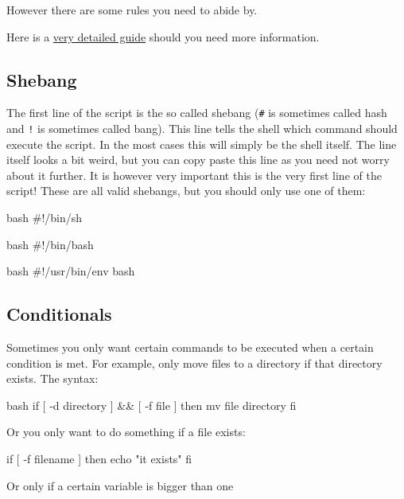 However there are some rules you need to abide by.

Here is a \href{http://www.tldp.org/LDP/Bash-Beginners-Guide/html/}{very detailed guide} should you need more information.

\subsection{Shebang}
The first line of the script is the so called shebang (\verb|#| is sometimes called
hash and \verb|!| is sometimes called bang). This line tells the shell which
command should execute the script. In the most cases this will simply be the
shell itself. The line itself looks a bit weird, but you can copy paste this
line as you need not worry about it further. It is however very important this
is the very first line of the script! These are all valid shebangs, but you should
only use one of them:

\begin{code}{bash}
 #!/bin/sh
\end{code}

\begin{code}{bash}
 #!/bin/bash
\end{code}

\begin{code}{bash}
 #!/usr/bin/env bash
\end{code}

\subsection{Conditionals}

Sometimes you only want certain commands to be executed when a certain condition
is met. For example, only move files to a directory if that directory exists.
The syntax:

\begin{code}{bash}
 if [ -d directory ] && [ -f file ]
 then
    mv file directory
 fi

Or you only want to do something if  a file exists:

 if [ -f filename ]
 then
    echo "it exists"
 fi
\end{code}

Or only if a certain variable is bigger than one


